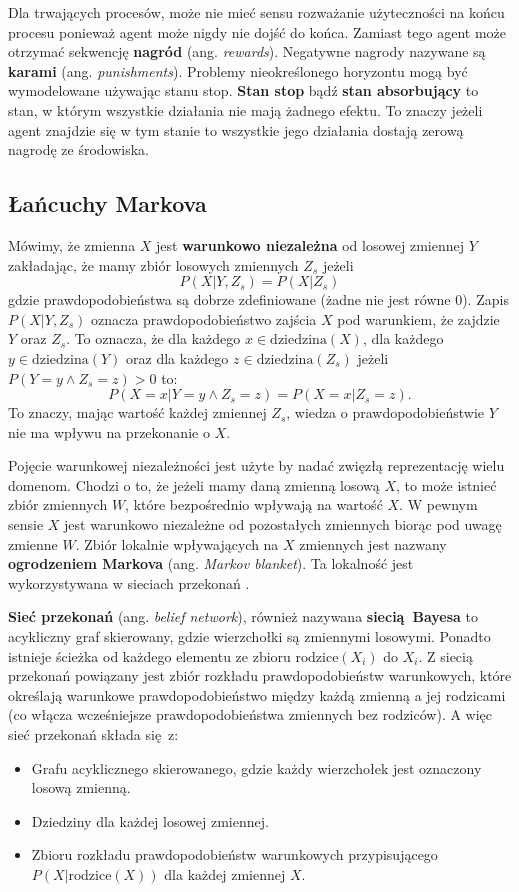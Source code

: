 \documentclass[a4paper, 12pt,twoside]{report}
\begin{document}
Dla trwających procesów, może nie mieć sensu rozważanie użyteczności na końcu
procesu ponieważ agent może nigdy nie dojść do końca. Zamiast tego agent może
otrzymać sekwencję \textbf{nagród} (ang. \textit{rewards}).
Negatywne nagrody nazywane są \textbf{karami} (ang. \textit{punishments}).
Problemy nieokreślonego horyzontu mogą być wymodelowane używając stanu
stop. \textbf{Stan stop} bądź \textbf{stan absorbujący} to stan, w którym
wszystkie działania nie mają żadnego efektu. To znaczy jeżeli agent znajdzie
się w tym stanie to wszystkie jego działania dostają zerową nagrodę ze
środowiska.

\subsection{Łańcuchy Markova}
Mówimy, że zmienna $X$ jest \textbf{warunkowo niezależna} od losowej zmiennej
$Y$ zakładając, że mamy zbiór losowych zmiennych $Z_s$ jeżeli
\[P(X | Y, Z_s) = P(X| Z_s)\]
gdzie prawdopodobieństwa są dobrze zdefiniowane (żadne nie jest równe $0$).
Zapis $P(X| Y, Z_s)$ oznacza prawdopodobieństwo zajścia $X$ pod
warunkiem, że zajdzie $Y$ oraz $Z_s$. To oznacza, że dla każdego $x \in
\text{dziedzina}(X)$, dla każdego $y \in \text{dziedzina}(Y)$ oraz dla każdego
$z \in \text{dziedzina}(Z_s)$ jeżeli $P(Y = y \wedge Z_s = z) > 0$ to:
\[P(X=x|Y=y \wedge Z_s = z) = P(X=x|Z_s = z).\]
To znaczy, mając wartość każdej zmiennej $Z_s$, wiedza o prawdopodobieństwie
$Y$ nie ma wpływu na przekonanie o $X$.

Pojęcie warunkowej niezależności jest użyte by nadać zwięzłą reprezentację
wielu domenom. Chodzi o to, że jeżeli mamy daną zmienną losową $X$, to może
istnieć zbiór zmiennych $W$, które bezpośrednio wpływają na wartość $X$. W
pewnym sensie $X$ jest warunkowo niezależne od pozostałych zmiennych biorąc pod
uwagę  zmienne $W$. Zbiór lokalnie wpływających na $X$ zmiennych jest nazwany
\textbf{ogrodzeniem Markova} (ang. \textit{Markov blanket}). Ta lokalność
jest wykorzystywana w sieciach przekonań \cite{ai_foundations_belief_networks}.

\textbf{Sieć przekonań} (ang. \textit{belief network}), również nazywana
\textbf{siecią Bayesa} to acykliczny graf skierowany, gdzie wierzchołki są
zmiennymi losowymi. Ponadto istnieje ścieżka od każdego elementu ze zbioru
$\text{rodzice}(X_i)$ do $X_i$. Z siecią przekonań powiązany jest zbiór
rozkładu prawdopodobieństw warunkowych, które określają warunkowe
prawdopodobieństwo między każdą zmienną a jej rodzicami (co włącza wcześniejsze
prawdopodobieństwa zmiennych bez rodziców). A więc sieć przekonań składa się z:
\begin{itemize}
	\setlength\itemsep{-0.4em}
\item Grafu acyklicznego skierowanego, gdzie każdy wierzchołek jest oznaczony
	losową zmienną.
\item Dziedziny dla każdej losowej zmiennej.
\item Zbioru rozkładu prawdopodobieństw warunkowych przypisującego
	$P(X|\text{rodzice}(X))$ dla każdej zmiennej $X$.
\end{itemize}
\end{document}
